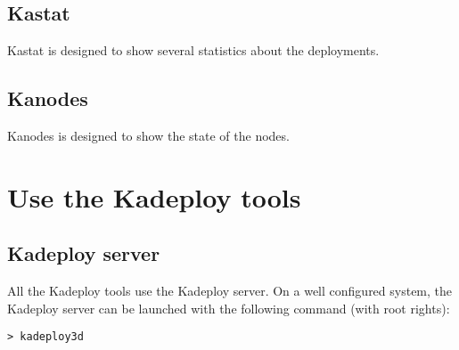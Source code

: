 \documentclass[a4wide,10pt,oneside]{book}
\begin{document}
\subsection{Kastat}
Kastat is designed to show several statistics about the deployments.

\subsection{Kanodes}
Kanodes is designed to show the state of the nodes.

\section{Use the Kadeploy tools}
\subsection{Kadeploy server}
All the Kadeploy tools use the Kadeploy server. On a well configured system, the Kadeploy server can be launched with the following command (with root rights):
\begin{verbatim}
> kadeploy3d
\end{verbatim}
\end{document}
